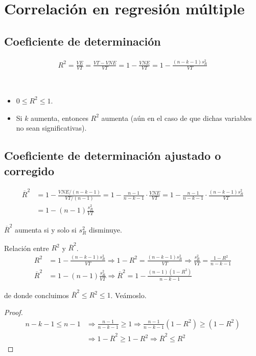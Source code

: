 \section{Correlación en regresión múltiple}

\subsection{Coeficiente de determinación}

\begin{align*}
    R^2 = \frac{VE}{VT} = \frac{VT - VNE}{VT} = 1 - \frac{VNE}{VT} = 1 - \frac{(n-k-1)s_R^2}{VT}
\end{align*}
\begin{obs}
\
    \begin{itemize}
        \item $0 \leq R^2 \leq 1$.
        \item Si $k$ aumenta, entonces $R^2$ aumenta (aún en el caso de que dichas variables no sean significativas).
    \end{itemize}
\end{obs}

\subsection{Coeficiente de determinación ajustado o corregido}

\begin{align*}
    \overline{R}^2 &= 1 - \frac{VNE/(n-k-1)}{VT/(n-1)} = 1 - \frac{n-1}{n-k-1} \cdot \frac{VNE}{VT} = 1 - \frac{n-1}{n-k-1} \cdot \frac{(n-k-1)s_R^2}{VT} \\
    &= 1 - (n-1) \frac{s_R^2}{VT}
\end{align*}
\begin{obs}
    $\overline{R}^2$ aumenta si y solo si $s_R^2$ disminuye.
\end{obs}

\begin{obs}
    Relación entre $R^2$ y $\overline{R}^2$.
    \begin{align*}
        R^2 &= 1 - \frac{(n-k-1)s_R^2}{VT} \Longrightarrow 1 - R^2 = \frac{(n-k-1)s_R^2}{VT} \Longrightarrow \frac{s_R^2}{VT} = \frac{1 - R^2}{n-k-1} \\
        \overline{R}^2 &= 1 - (n-1) \frac{s_R^2}{VT} \Longrightarrow \overline{R}^2 = 1 - \frac{(n-1)(1-R^2)}{n-k-1}
    \end{align*}
\end{obs}
de donde concluimos $\boxed{\overline{R}^2 \leq R^2 \leq 1}$. Veámoslo.
\begin{proof}
\begin{align*}
    n-k-1 \leq n -1 &\Longrightarrow \frac{n-1}{n-k-1} \ge 1 
    \Longrightarrow \frac{n-1}{n-k-1}(1-R^2) \ge (1-R^2) \\
    &\Longrightarrow 1 - \overline{R}^2 \ge 1 - R^2 
    \Longrightarrow \overline{R}^2 \leq R^2
\end{align*}
\end{proof}

